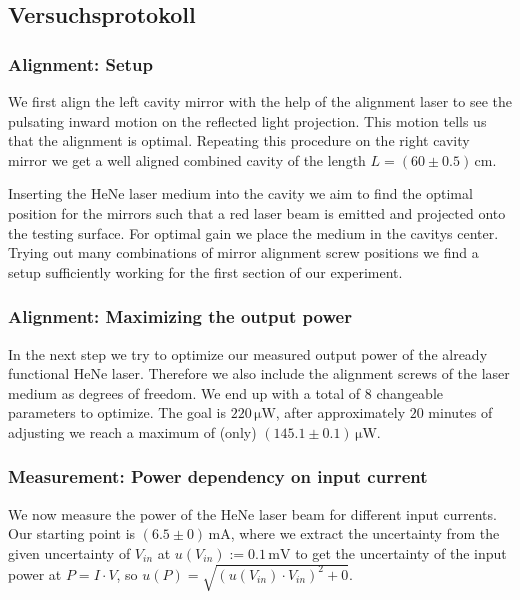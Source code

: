 \documentclass[../../main.tex]{subfiles}
\begin{document}
    \subsection*{Versuchsprotokoll} 
    \subsubsection*{Alignment: Setup}\label{subsubsec:AlignmentSetup}
        We first align the left cavity mirror with the help of the alignment laser to see the pulsating inward motion on the reflected light projection. This motion tells us that the alignment is optimal. Repeating this procedure on the right cavity mirror we get a well aligned combined cavity of the length $L = (60\pm 0.5)\,\si{\cm}$.

        Inserting the HeNe laser medium into the cavity we aim to find the optimal position for the mirrors such that a red laser beam is emitted and projected onto the testing surface. For optimal gain we place the medium in the cavitys center. Trying out many combinations of mirror alignment screw positions we find a setup sufficiently working for the first section of our experiment. 

    \subsubsection*{Alignment: Maximizing the output power}\label{subsubsec:AlignmentMaxPower}
        In the next step we try to optimize our measured output power of the already functional HeNe laser. Therefore we also include the alignment screws of the laser medium as degrees of freedom. We end up with a total of $8$ changeable parameters to optimize. The goal is $220\,\si{\micro\watt}$, after approximately $20$ minutes of adjusting we reach a maximum of (only) $(145.1\pm 0.1)\,\si{\micro\watt}$. 

    \subsubsection*{Measurement: Power dependency on input current}\label{subsubsec:MeasurementPowerdependencyOnCurrent}
        We now measure the power of the HeNe laser beam for different input currents. Our starting point is $(6.5\pm 0)\,\si{\mA}$, where we extract the uncertainty from the given uncertainty of $V_{\textit{in}}$ at $u(V_{\textit{in}}):=0.1\,\si{\mV}$ to get the uncertainty of the input power at $P = I\cdot V$, so $u(P) = \sqrt{(u(V_{\textit{in}})\cdot V_{\textit{in}})^2 + 0}$.
\end{document}
